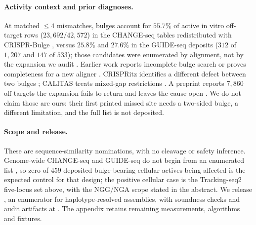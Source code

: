 \paragraph{Activity context and prior diagnoses.}
At matched $\le4$ mismatches, bulges account for $55.7\%$ of active in vitro off-target
rows ($23{,}692/42{,}572$) in the CHANGE-seq tables redistributed with CRISPR-Bulge
\citep{lazzarotto2020changeseq,yaish2024bulges}, versus $25.8\%$ and $27.6\%$ in the
GUIDE-seq deposits ($312$ of $1{,}207$ and $147$ of $533$); those candidates were enumerated by alignment, not by the expansion we
audit \citep{yaish2023swoffinder,yaish2024bulges}. Earlier work reports incomplete bulge
search or proves completeness for a new aligner
\citep{yaish2023swoffinder,yaish2024bulges}. CRISPRitz identifies a different defect
between two bulges \citep{cancellieri2020crispritz}; CALITAS treats mixed-gap restrictions
\citep{fennell2021calitas}. A preprint reports $7{,}860$ off-targets the expansion fails to
return and leaves the cause open \citep{labun2025chopoff}. We do not claim those are ours:
their first printed missed site needs a two-sided bulge, a different limitation, and the
full list is not deposited.

\paragraph{Scope and release.}
These are sequence-similarity nominations, with no cleavage or safety inference.
Genome-wide CHANGE-seq and GUIDE-seq do not begin from an enumerated list
\citep{lazzarotto2020changeseq,tsai2015guideseq}, so zero of $459$ deposited
bulge-bearing cellular actives being affected is the expected control for that design;
the positive cellular case is the Tracking-seq2 five-locus set above, with the NGG/NGA
scope stated in the abstract. We release \toolname, an enumerator for haplotype-resolved
assemblies, with soundness checks and audit artifacts at \repourl. The appendix retains
remaining measurements, algorithms and fixtures.
